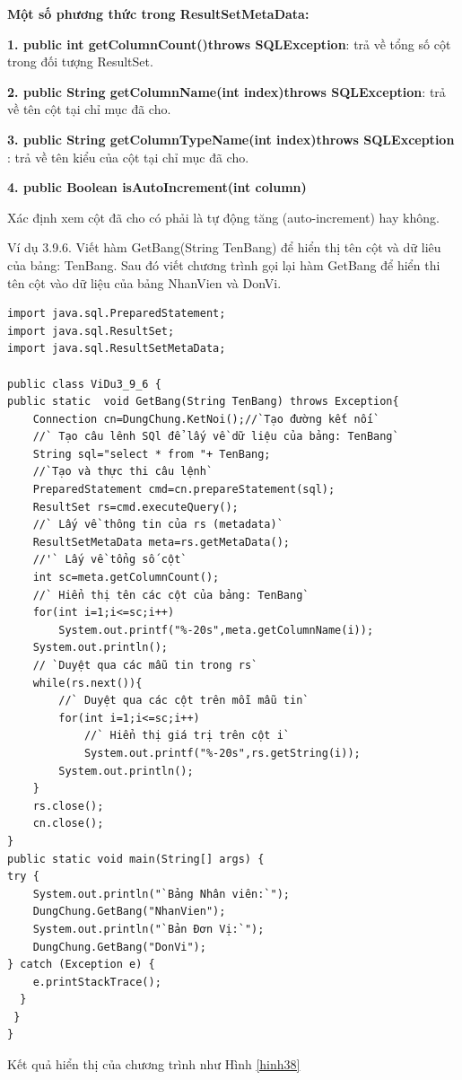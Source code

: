 \textbf{Một số phương thức trong ResultSetMetaData:}

\textbf{1. public int getColumnCount()throws SQLException}:
trả về tổng số cột trong đối tượng ResultSet.

\textbf{2. public String getColumnName(int index)throws SQLException}: trả về tên cột tại chỉ mục đã cho.

\textbf{3. public String getColumnTypeName(int index)throws SQLException
}: trả về tên kiểu của cột tại chỉ mục đã cho.

\textbf{4. public Boolean isAutoIncrement(int column)}

Xác định xem cột đã cho có phải là tự động tăng (auto-increment) hay không.

Ví dụ 3.9.6. Viết hàm GetBang(String TenBang) để hiển thị tên cột và dữ liêu của bảng: TenBang. Sau đó viết chương trình gọi lại hàm GetBang để hiển thi tên cột vào dữ liệu của bảng NhanVien và DonVi.
\begin{lstlisting}[escapechar=`]
import java.sql.PreparedStatement;
import java.sql.ResultSet;
import java.sql.ResultSetMetaData;

public class ViDu3_9_6 {
public static  void GetBang(String TenBang) throws Exception{
	Connection cn=DungChung.KetNoi();//`Tạo đường kết nối`
	//` Tạo câu lênh SQl để lấy về dữ liệu của bảng: TenBang`
	String sql="select * from "+ TenBang;
	//`Tạo và thực thi câu lệnh`
	PreparedStatement cmd=cn.prepareStatement(sql);
	ResultSet rs=cmd.executeQuery();
	//` Lấy về thông tin của rs (metadata)`
	ResultSetMetaData meta=rs.getMetaData();
	//'` Lấy về tổng số cột`
	int sc=meta.getColumnCount();
	//` Hiển thị tên các cột của bảng: TenBang`
	for(int i=1;i<=sc;i++)
		System.out.printf("%-20s",meta.getColumnName(i));
	System.out.println();
	// `Duyệt qua các mẫu tin trong rs`
	while(rs.next()){
		//` Duyệt qua các cột trên mỗi mẫu tin`
		for(int i=1;i<=sc;i++)
			//` Hiển thị giá trị trên cột i`
			System.out.printf("%-20s",rs.getString(i));
		System.out.println();
	}
	rs.close();
	cn.close();
}
public static void main(String[] args) {
try {
	System.out.println("`Bảng Nhân viên:`");
	DungChung.GetBang("NhanVien");
	System.out.println("`Bản Đơn Vị:`");
	DungChung.GetBang("DonVi");
} catch (Exception e) {
	e.printStackTrace();
  }
 }
}
\end{lstlisting}
Kết quả hiển thị của chương trình như Hình \ref{hinh38}


